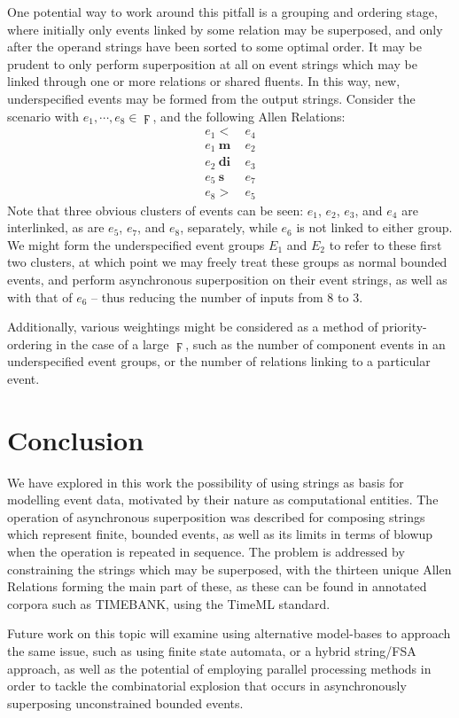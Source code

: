 \documentclass[a4paper,11pt]{article}
\begin{document}
One potential way to work around this pitfall is a grouping and ordering stage, 
where initially only events linked by some relation may be superposed, and only 
after the operand strings have been sorted to some optimal order. It may be 
prudent to only perform superposition at all on event strings which may be 
linked through one or more relations or shared fluents. In this way, new, 
underspecified events may be formed from the output strings. Consider the 
scenario with $e_1, \cdots, e_8 \in \digamma$, and the following Allen 
Relations:
\begin{align*}
e_1 <& ~e_4\\
e_1 ~\mathbf{m}& ~e_2\\
e_2 ~\mathbf{di}& ~e_3\\
e_5 ~\mathbf{s}& ~e_7\\
e_8 >& ~e_5
\end{align*}
Note that three obvious clusters of events can be seen: $e_1$, $e_2$, $e_3$, 
and $e_4$ 
are interlinked, as are $e_5$, $e_7$, and $e_8$, separately, while $e_6$ is not 
linked to either group. We might form the underspecified event groups $E_1$ and 
$E_2$ to refer to these first two clusters, at which point we may freely treat 
these groups as normal bounded events, and perform asynchronous superposition 
on their event strings, as well as with that of $e_6$ -- thus reducing the 
number of inputs from 8 to 3.

Additionally, various weightings might be considered as a method of 
priority-ordering in the case of a large $\digamma$, such as the number of 
component events in an underspecified event groups, or the number of relations 
linking to a particular event.
\section{Conclusion}
We have explored in this work the possibility of using strings as basis for 
modelling event data, motivated by their nature as computational entities. The 
operation of asynchronous superposition was described for composing strings 
which represent finite, bounded events, as well as its limits in terms of 
blowup when the operation is repeated in sequence. The problem is addressed by 
constraining the strings which may be superposed, with the thirteen unique 
Allen Relations forming the main part of these, as these can be found in 
annotated corpora such as TIMEBANK, using the TimeML standard.

Future work on this topic will examine using alternative model-bases to 
approach the same issue, such as using finite state automata, or a hybrid 
string/FSA approach, as well as the potential of employing parallel processing 
methods in order to tackle the combinatorial explosion that occurs in 
asynchronously superposing unconstrained bounded events.
{}

\end{document}
